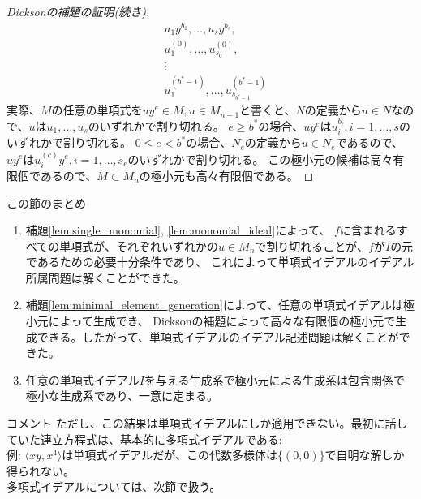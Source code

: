 \begin{frame}
	\begin{proof} [Dicksonの補題の証明(続き)]
		\begin{align*}
			 & u_1y^{b_1}, \ldots, u_sy^{b_s},                \\
			 & u_1^{(0)}, \ldots, u_{s_0}^{(0)},              \\
			 & \vdots                                         \\
			 & u_1^{(b^*-1)}, \ldots, u_{s_{b^*-1}}^{(b^*-1)}
		\end{align*}
		実際、$M$の任意の単項式を$uy^e \in M, u \in M_{n-1}$と書くと、$N$の定義から$u \in N$なので、$u$は$u_1, \ldots, u_s$のいずれかで割り切れる。
		$e \geq b^*$の場合、$uy^e$は$u_i^{b_i}, i=1,\ldots,s$のいずれかで割り切れる。
		$0 \leq e < b^*$の場合、$N_e$の定義から$u \in N_e$であるので、$uy^e$は$u_i^{(c)}y^e, i=1,\ldots,s_e$のいずれかで割り切れる。
		この極小元の候補は高々有限個であるので、$M \subset M_n$の極小元も高々有限個である。
	\end{proof}
\end{frame}

\begin{frame} {この節のまとめ}
	\begin{enumerate}
		\item 補題\ref{lem:single_monomial}, \ref{lem:monomial_ideal}によって、
		      $f$に含まれるすべての単項式が、それぞれいずれかの$u \in M_n$で割り切れることが、$f$が$I$の元であるための必要十分条件であり、
		      これによって単項式イデアルのイデアル所属問題は解くことができた。
		\item 補題\ref{lem:minimal_element_generation}によって、任意の単項式イデアルは極小元によって生成でき、
		      Dicksonの補題によって高々な有限個の極小元で生成できる。したがって、単項式イデアルのイデアル記述問題は解くことができた。
		\item 任意の単項式イデアル$I$を与える生成系で極小元による生成系は包含関係で極小な生成系であり、一意に定まる。
	\end{enumerate}

	\begin{block} {コメント}
		ただし、この結果は単項式イデアルにしか適用できない。最初に話していた連立方程式は、基本的に多項式イデアルである: \\
		例: $\langle xy, x^4 \rangle$は単項式イデアルだが、この代数多様体は$\{(0,0)\}$で自明な解しか得られない。\\
		多項式イデアルについては、次節で扱う。
	\end{block}
\end{frame}
